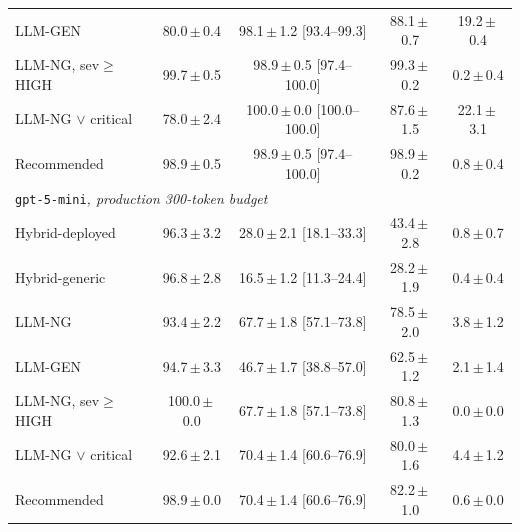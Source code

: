 \begin{table}[t]
\begin{tabular}{lcccc}
LLM-GEN & 80.0\,$\pm$\,0.4 & 98.1\,$\pm$\,1.2 {\scriptsize[93.4--99.3]} & 88.1\,$\pm$\,0.7 & 19.2\,$\pm$\,0.4 \\
LLM-NG, sev$\geq$HIGH & 99.7\,$\pm$\,0.5 & 98.9\,$\pm$\,0.5 {\scriptsize[97.4--100.0]} & 99.3\,$\pm$\,0.2 & 0.2\,$\pm$\,0.4 \\
LLM-NG $\lor$ critical & 78.0\,$\pm$\,2.4 & 100.0\,$\pm$\,0.0 {\scriptsize[100.0--100.0]} & 87.6\,$\pm$\,1.5 & 22.1\,$\pm$\,3.1 \\
Recommended & 98.9\,$\pm$\,0.5 & 98.9\,$\pm$\,0.5 {\scriptsize[97.4--100.0]} & 98.9\,$\pm$\,0.2 & 0.8\,$\pm$\,0.4 \\
\midrule\multicolumn{5}{l}{\texttt{gpt-5-mini}\textit{, production 300-token budget}}\\
Hybrid-deployed & 96.3\,$\pm$\,3.2 & 28.0\,$\pm$\,2.1 {\scriptsize[18.1--33.3]} & 43.4\,$\pm$\,2.8 & 0.8\,$\pm$\,0.7 \\
Hybrid-generic & 96.8\,$\pm$\,2.8 & 16.5\,$\pm$\,1.2 {\scriptsize[11.3--24.4]} & 28.2\,$\pm$\,1.9 & 0.4\,$\pm$\,0.4 \\
LLM-NG & 93.4\,$\pm$\,2.2 & 67.7\,$\pm$\,1.8 {\scriptsize[57.1--73.8]} & 78.5\,$\pm$\,2.0 & 3.8\,$\pm$\,1.2 \\
LLM-GEN & 94.7\,$\pm$\,3.3 & 46.7\,$\pm$\,1.7 {\scriptsize[38.8--57.0]} & 62.5\,$\pm$\,1.2 & 2.1\,$\pm$\,1.4 \\
LLM-NG, sev$\geq$HIGH & 100.0\,$\pm$\,0.0 & 67.7\,$\pm$\,1.8 {\scriptsize[57.1--73.8]} & 80.8\,$\pm$\,1.3 & 0.0\,$\pm$\,0.0 \\
LLM-NG $\lor$ critical & 92.6\,$\pm$\,2.1 & 70.4\,$\pm$\,1.4 {\scriptsize[60.6--76.9]} & 80.0\,$\pm$\,1.6 & 4.4\,$\pm$\,1.2 \\
Recommended & 98.9\,$\pm$\,0.0 & 70.4\,$\pm$\,1.4 {\scriptsize[60.6--76.9]} & 82.2\,$\pm$\,1.0 & 0.6\,$\pm$\,0.0 \\
\bottomrule\end{tabular}\end{table}

